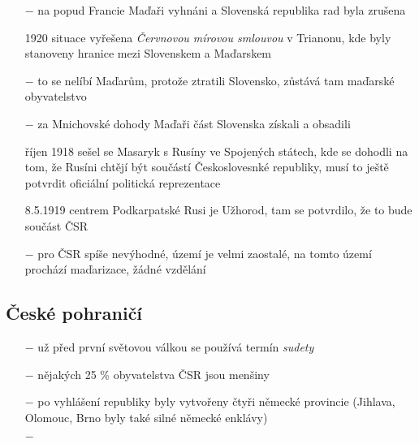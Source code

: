 \documentclass{article}
\begin{document}
\begin{itemize}
    \item[$-$]  na popud Francie Maďaři vyhnáni a Slovenská republika rad byla zrušena
    \item[1920] situace vyřešena \textit{Červnovou mírovou smlouvou} v Trianonu, kde byly stanoveny hranice mezi Slovenskem a Maďarskem
    \item[$-$] to se nelíbí Maďarům, protože ztratili Slovensko, zůstává tam maďarské obyvatelstvo
    \item[$-$] za Mnichovské dohody Maďaři část Slovenska získali a obsadili
    \item[říjen 1918] sešel se Masaryk s Rusíny ve Spojených státech, kde se dohodli na  tom, že Rusíni chtějí být součástí Českoslovesnké republiky, musí to ještě potvrdit oficiální politická reprezentace
    \item[8.5.1919] centrem Podkarpatské Rusi je Užhorod, tam se potvrdilo, že to bude součást ČSR
    \item[$-$] pro ČSR spíše nevýhodné, území je velmi zaostalé, na tomto území prochází maďarizace, žádné vzdělání
\end{itemize}

\subsection*{České pohraničí}
\begin{itemize}
    \vspace{-0.5em}
    \setlength\itemsep{0.15em}
    \item[$-$] už před první světovou válkou se používá termín \textit{sudety}
    \item[$-$] nějakých 25 \% obyvatelstva ČSR jsou menšiny
    \item[$-$] po vyhlášení republiky byly vytvořeny čtyři německé provincie (Jihlava, Olomouc, Brno byly také silné německé enklávy)
    \item[$-$]
\end{itemize}
\end{document}
